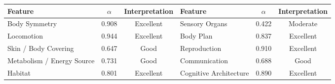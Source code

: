\begin{tabular}{lcclcc}
  \toprule
  Feature & $\alpha$ & Interpretation & Feature & $\alpha$ & Interpretation \\
  \midrule
  Body Symmetry & 0.908 & Excellent & Sensory Organs & 0.422 & Moderate \\
  Locomotion & 0.944 & Excellent & Body Plan & 0.837 & Excellent \\
  Skin / Body Covering & 0.647 & Good & Reproduction & 0.910 & Excellent \\
  Metabolism / Energy Source & 0.731 & Good & Communication & 0.688 & Good \\
  Habitat & 0.801 & Excellent & Cognitive Architecture & 0.890 & Excellent \\
  \bottomrule
\end{tabular}
